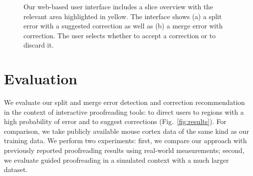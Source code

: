 \begin{figure}[hb]
 \centering
    \hfill
	\caption{Our web-based user interface includes a slice overview with the relevant area highlighted in yellow. The interface shows (a) a split error with a suggested correction as well as (b) a merge error with correction. The user selects whether to accept a correction or to discard it.}
\label{fig:prototype}
\end{figure}

\section{Evaluation}
\label{sec:evaluation}




We evaluate our split and merge error detection and correction recommendation in the context of interactive proofreading tools: to direct users to regions with a high probability of error and to suggest corrections (Fig.~\ref{fig:results}). For comparison, we take publicly available mouse cortex data of the same kind as our training data. We perform two experiments: first, we compare our approach with previously reported proofreading results using real-world measurements; second, we evaluate guided proofreading in a simulated context with a much larger dataset.

